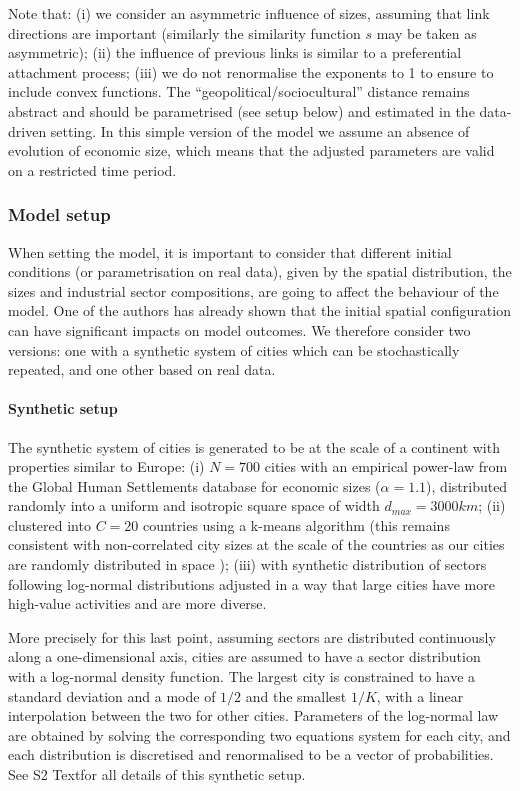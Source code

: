 \documentclass[10pt,letterpaper]{article}
\providecommand{\DIFadd}[1]{{\protect\color{blue}\uwave{#1}}} %
\providecommand{\DIFaddbegin}{} %
\providecommand{\DIFaddend}{} %
\begin{document}
Note that: (i) we consider an asymmetric influence of sizes, assuming that link directions are important (similarly the similarity function $s$ may be taken as asymmetric); (ii) the influence of previous links is similar to a preferential attachment process; (iii) we do not renormalise the exponents to 1 to ensure to include convex functions. The ``geopolitical/sociocultural'' distance remains abstract and should be parametrised (see setup below) and estimated in the data-driven setting. In this simple version of the model we assume an absence of evolution of economic size, which means that the adjusted parameters are valid on a restricted time period.


\subsubsection*{Model setup}

When setting the model, it is important to consider that different initial conditions (or parametrisation on real data), given by the spatial distribution, the sizes and industrial sector compositions, are going to affect the behaviour of the model. One of the authors \cite{raimbault2019space} has already shown that the initial spatial configuration can have significant impacts on model outcomes. We therefore consider two versions: one with a synthetic system of cities which can be stochastically repeated, and one other based on real data.


\paragraph{Synthetic setup}

The synthetic system of cities is generated to be at the scale of a continent with properties similar to Europe: (i) $N=700$ cities with an empirical power-law from the Global Human Settlements database for economic sizes ($\alpha = 1.1$), distributed randomly into a uniform and isotropic square space of width $d_{max}=3000km$;
(ii) clustered into $C = 20$ countries using a k-means algorithm (this remains consistent with non-correlated city sizes at the scale of the countries as our cities are randomly distributed in space \cite{simini2019testing});
(iii) with synthetic distribution of sectors following log-normal distributions adjusted in a way that large cities have more high-value activities and are more diverse.

More precisely for this last point, assuming sectors are distributed continuously along a one-dimensional axis, cities are assumed to have a sector distribution with a log-normal density function. The largest city is constrained to have a standard deviation and a mode of $1/2$ and the smallest $1/K$, with a linear interpolation between the two for other cities. Parameters of the log-normal law are obtained by solving the corresponding two equations system for each city, and each distribution is discretised and renormalised to be a vector of probabilities. See S2 Text\DIFaddbegin \DIFadd{\ref{S2Text} }\DIFaddend for all details of this synthetic setup.
\end{document}
